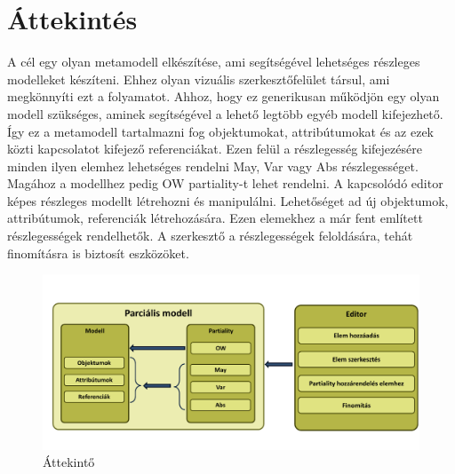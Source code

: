 \chapter{Áttekintés}


A cél egy olyan metamodell elkészítése, ami segítségével lehetséges részleges modelleket készíteni. Ehhez olyan vizuális szerkesztőfelület társul, ami megkönnyíti ezt a folyamatot. Ahhoz, hogy ez generikusan működjön egy olyan modell szükséges, aminek segítségével a lehető legtöbb egyéb modell kifejezhető. Így ez a metamodell tartalmazni fog objektumokat, attribútumokat és az ezek közti kapcsolatot kifejező referenciákat. Ezen felül a részlegesség kifejezésére minden ilyen elemhez lehetséges rendelni May, Var vagy Abs részlegességet. Magához a modellhez pedig OW partiality-t lehet rendelni.
A kapcsolódó editor képes részleges modellt létrehozni és manipulálni. Lehetőséget ad új objektumok, attribútumok, referenciák létrehozására. Ezen elemekhez a már fent említett részlegességek rendelhetők. A szerkesztő a részlegességek feloldására, tehát finomításra is biztosít eszközöket.



\begin{figure}[!ht]
	\includegraphics[width=150mm]{figures/overview.pdf}
	\caption{Áttekintő} 
\end{figure}

